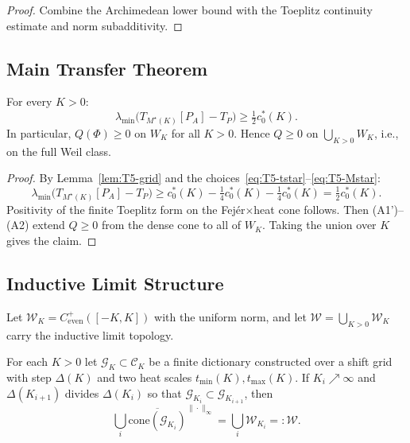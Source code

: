 \begin{proof}
Combine the Archimedean lower bound with the Toeplitz continuity estimate and norm subadditivity.
\end{proof}

\subsection{Main Transfer Theorem}

\begin{theorem}\label{thm:T5-compact}
For every $K > 0$:
\begin{equation}
  \lambda_{\min}\!\big(T_{M^\star(K)}[P_A] - T_P\big) \geq \tfrac{1}{2} c_0^\ast(K).
\end{equation}
In particular, $Q(\Phi) \geq 0$ on $W_K$ for all $K > 0$. Hence $Q \geq 0$ on $\bigcup_{K>0} W_K$, i.e., on the full Weil class.
\end{theorem}

\begin{proof}
By Lemma~\ref{lem:T5-grid} and the choices~\eqref{eq:T5-tstar}--\eqref{eq:T5-Mstar}:
\begin{equation}
  \lambda_{\min}\!\big(T_{M^\star(K)}[P_A] - T_P\big) \geq c_0^\ast(K) - \tfrac{1}{4} c_0^\ast(K) - \tfrac{1}{4} c_0^\ast(K) = \tfrac{1}{2} c_0^\ast(K).
\end{equation}
Positivity of the finite Toeplitz form on the Fej\'er$\times$heat cone follows. Then (A1')--(A2) extend $Q \geq 0$ from the dense cone to all of $W_K$. Taking the union over $K$ gives the claim.
\end{proof}

\subsection{Inductive Limit Structure}

Let $\mathcal{W}_K = C^+_{\mathrm{even}}([-K, K])$ with the uniform norm, and let $\mathcal{W} = \bigcup_{K>0} \mathcal{W}_K$ carry the inductive limit topology.

\begin{lemma}\label{lem:T5-dicts}
For each $K > 0$ let $\mathcal{G}_K \subset \mathcal{C}_K$ be a finite dictionary constructed over a shift grid with step $\Delta(K)$ and two heat scales $t_{\min}(K), t_{\max}(K)$. If $K_i \nearrow \infty$ and $\Delta(K_{i+1})$ divides $\Delta(K_i)$ so that $\mathcal{G}_{K_i} \subset \mathcal{G}_{K_{i+1}}$, then
\begin{equation}
  \bigcup_i \overline{\mathrm{cone}(\mathcal{G}_{K_i})}^{\|\cdot\|_\infty} = \bigcup_i \mathcal{W}_{K_i} =: \mathcal{W}.
\end{equation}
\end{lemma}

